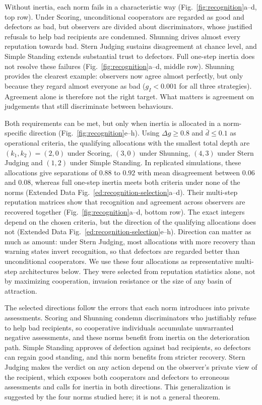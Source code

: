 \documentclass[fleqn,10pt]{article}
\begin{document}
Without inertia, each norm fails in a characteristic way (Fig.~\ref{fig:recognition}a--d, top row). Under Scoring, unconditional cooperators are regarded as good and defectors as bad, but observers are divided about discriminators, whose justified refusals to help bad recipients are condemned. Shunning drives almost every reputation towards bad. Stern Judging sustains disagreement at chance level, and Simple Standing extends substantial trust to defectors. Full one-step inertia does not resolve these failures (Fig.~\ref{fig:recognition}a--d, middle row). Shunning provides the clearest example: observers now agree almost perfectly, but only because they regard almost everyone as bad ($g_I<0.001$ for all three strategies). Agreement alone is therefore not the right target. What matters is agreement on judgements that still discriminate between behaviours.

Both requirements can be met, but only when inertia is allocated in a norm-specific direction (Fig.~\ref{fig:recognition}e--h). Using $\Delta g\geq0.8$ and $\bar d\leq0.1$ as operational criteria, the qualifying allocations with the smallest total depth are $(k_1,k_2)=(2,0)$ under Scoring, $(3,0)$ under Shunning, $(4,3)$ under Stern Judging and $(1,2)$ under Simple Standing. In replicated simulations, these allocations give separations of $0.88$ to $0.92$ with mean disagreement between $0.06$ and $0.08$, whereas full one-step inertia meets both criteria under none of the norms (Extended Data Fig.~\ref{ed:recognition-selection}a--d). Their multi-step reputation matrices show that recognition and agreement across observers are recovered together (Fig.~\ref{fig:recognition}a--d, bottom row). The exact integers depend on the chosen criteria, but the direction of the qualifying allocations does not (Extended Data Fig.~\ref{ed:recognition-selection}e--h). Direction can matter as much as amount: under Stern Judging, most allocations with more recovery than warning states invert recognition, so that defectors are regarded better than unconditional cooperators. We use these four allocations as representative multi-step architectures below. They were selected from reputation statistics alone, not by maximizing cooperation, invasion resistance or the size of any basin of attraction.

The selected directions follow the errors that each norm introduces into private assessments. Scoring and Shunning condemn discriminators who justifiably refuse to help bad recipients, so cooperative individuals accumulate unwarranted negative assessments, and these norms benefit from inertia on the deterioration path. Simple Standing approves of defection against bad recipients, so defectors can regain good standing, and this norm benefits from stricter recovery. Stern Judging makes the verdict on any action depend on the observer's private view of the recipient, which exposes both cooperators and defectors to erroneous assessments and calls for inertia in both directions. This generalization is suggested by the four norms studied here; it is not a general theorem.
\end{document}
